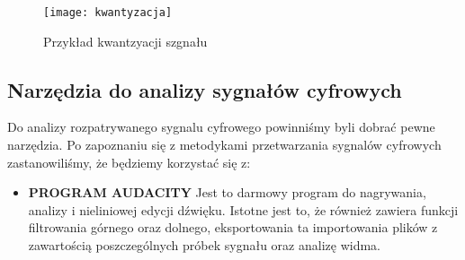 \documentclass[a4paper,titleauthor]{mwart}
\begin{document}
	\begin{figure}[h]
		\centering 
		\texttt{[image: kwantyzacja]}
		\caption{Przykład kwantzyacji szgnału}	
	\end{figure}
	\FloatBarrier
	\subsection{Narzędzia do analizy sygnałów cyfrowych}
	
	Do analizy rozpatrywanego sygnalu cyfrowego powinniśmy byli dobrać pewne narzędzia. Po zapoznaniu się z metodykami przetwarzania sygnalów cyfrowych zastanowiliśmy, że będziemy korzystać się z:
	
	\begin{itemize}
		\item \textbf{PROGRAM AUDACITY} \newline\newline
		Jest to darmowy program do nagrywania, analizy i nieliniowej edycji dźwięku. Istotne jest to, że również zawiera funkcji filtrowania górnego oraz dolnego, eksportowania ta importowania plików z zawartością poszczególnych próbek sygnału oraz analizę widma.\newline
		

\end{itemize}
\end{document}
